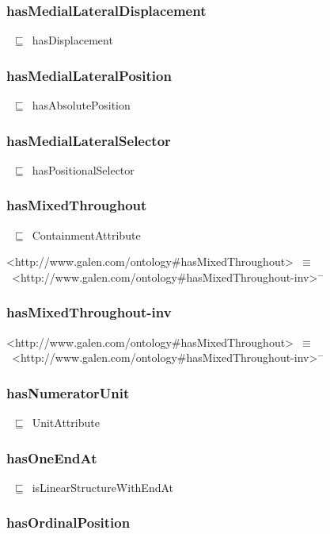 \documentclass{article}
\begin{document}
\subsubsection*{hasMedialLateralDisplacement}

~\ensuremath{\sqsubseteq}~hasDisplacement

\subsubsection*{hasMedialLateralPosition}

~\ensuremath{\sqsubseteq}~hasAbsolutePosition

\subsubsection*{hasMedialLateralSelector}

~\ensuremath{\sqsubseteq}~hasPositionalSelector

\subsubsection*{hasMixedThroughout}

~\ensuremath{\sqsubseteq}~ContainmentAttribute

<http://www.galen.com/ontology#hasMixedThroughout>~\ensuremath{\equiv}~<http://www.galen.com/ontology#hasMixedThroughout-inv>\ensuremath{^-}

\subsubsection*{hasMixedThroughout-inv}

<http://www.galen.com/ontology#hasMixedThroughout>~\ensuremath{\equiv}~<http://www.galen.com/ontology#hasMixedThroughout-inv>\ensuremath{^-}

\subsubsection*{hasNumeratorUnit}

~\ensuremath{\sqsubseteq}~UnitAttribute

\subsubsection*{hasOneEndAt}

~\ensuremath{\sqsubseteq}~isLinearStructureWithEndAt

\subsubsection*{hasOrdinalPosition}
\end{document}

